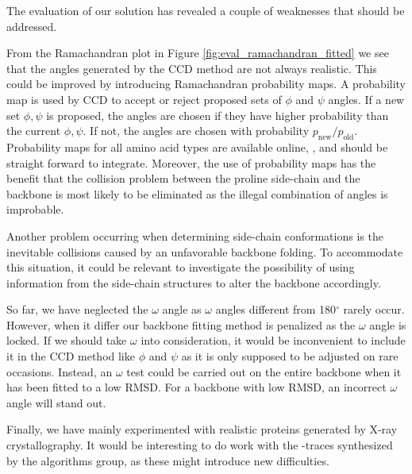 The evaluation of our solution has revealed a couple of weaknesses that should be addressed. 

From the Ramachandran plot in Figure \ref{fig:eval_ramachandran_fitted} we see that the angles generated by the CCD method are not always realistic.
This could be improved by introducing Ramachandran probability maps.
A probability map is used by CCD to accept or reject proposed sets of $\phi$ and $\psi$ angles.
If a new set $\phi,\psi$ is proposed, the angles are chosen if they have higher probability than the current $\phi,\psi$.
If not, the angles are chosen with probability $p_{\text{new}}/p_{\text{old}}$. 
Probability maps for all amino acid types are available online, \cite{10.1371/journal.pcbi.1000763}, and should be straight forward to integrate.
Moreover, the use of probability maps has the benefit that the collision problem between the proline side-chain and the backbone is most likely to be eliminated as the illegal combination of angles is improbable. 

Another problem occurring when determining side-chain conformations is the inevitable collisions caused by an unfavorable backbone folding. 
To accommodate this situation, it could be relevant to investigate the possibility of using information from the side-chain structures to alter the backbone accordingly. 

So far, we have neglected the $\omega$ angle as $\omega$ angles different from 180$^\circ$ rarely occur. 
However, when it differ our backbone fitting method is penalized as the $\omega$ angle is locked.
If we should take $\omega$ into consideration, it would be inconvenient to include it in the CCD method like $\phi$ and $\psi$ as it is only supposed to be adjusted on rare occasions.
Instead, an $\omega$ test could be carried out on the entire backbone when it has been fitted to a low RMSD.
For a backbone with low RMSD, an incorrect $\omega$ angle will stand out.

Finally, we have mainly experimented with realistic proteins generated by X-ray crystallography. 
It would be interesting to do work with the \Ca-traces synthesized by the algorithms group, as these might introduce new difficulties.




